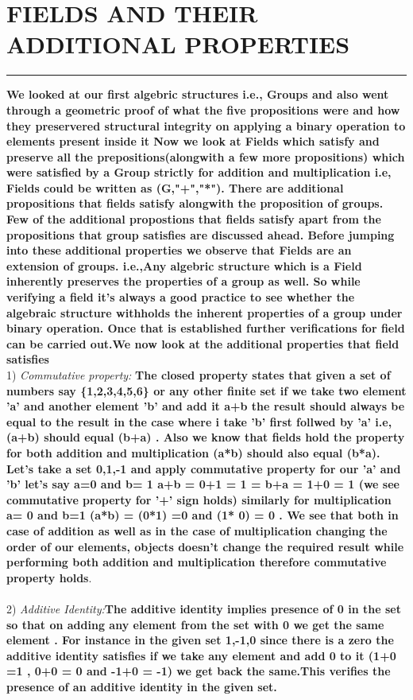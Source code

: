 \documentclass{article}
\begin{document}
\section * {FIELDS AND THEIR ADDITIONAL PROPERTIES}
\hrule 
\bigskip
\textbf{We looked at our first algebric structures i.e., Groups and also went through a geometric proof of what the five propositions  were and how they preservered structural integrity on applying a binary operation to elements present inside it
Now we look at Fields which satisfy and preserve all the prepositions(alongwith a few more propositions) which were satisfied by a Group strictly for addition and multiplication i.e, Fields could be written as  (G,"+","*"). There are additional  propositions that fields satisfy alongwith the proposition of groups. Few of the additional propostions that fields satisfy apart from the propositions that group satisfies are discussed ahead.
Before jumping into these additional properties we observe that Fields are an extension of groups. i.e.,Any algebric structure which is a Field inherently preserves the properties of a group as well. So while verifying a field it's always a good practice to see whether the algebraic structure withholds the inherent properties of a group under binary operation. Once that is established further verifications for field can be carried out.We now look at the additional properties that field satisfies
}
\\
1) \textit{Commutative property:\quad}\textbf{ The closed property states that given a set of numbers say \{1,2,3,4,5,6\} or any other finite set  if we take two element 'a' and another element 'b' and add it a+b the result should always be equal to the result in the case where i take 'b' first follwed by 'a' i.e, (a+b) should equal (b+a) . Also we know that fields hold the property for both addition and multiplication (a*b) should also equal (b*a).
    Let's take a set {0,1,-1} and apply commutative property for our 'a' and 'b' let's say a=0 and b= 1 a+b = 0+1 = 1 = b+a = 1+0 = 1 (we see commutative property for '+' sign holds) similarly for multiplication a= 0 and b=1 (a*b) = (0*1) =0 and (1* 0) = 0 . We see that both in case of addition as well as in the case of multiplication changing the order of our elements, objects doesn't change the required result 
while performing both addition and multiplication therefore commutative property holds}.
\\
\\
2) \textit{Additive Identity:\quad}\textbf{The additive identity implies presence of 0 in the set  so that on adding any element from the set with 0 we get the same element . For instance in the given set {1,-1,0} since there is a zero the additive identity satisfies if we take any element and add 0 to it (1+0 =1 , 0+0 = 0 and -1+0 = -1) we get back the same.This verifies the presence of  an additive identity in the given set.}
\end{document}
